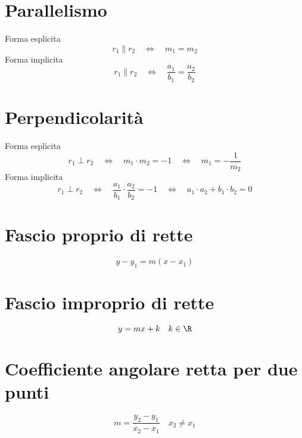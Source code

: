 \section{Parallelismo}
Forma esplicita
\begin{equation}
r_1\parallel r_2\quad\Longleftrightarrow\quad	m_1=m_2
\end{equation}
Forma implicita
\begin{equation}
r_1\parallel r_2\quad\Longleftrightarrow\quad \dfrac{a_1}{b_1}=\dfrac{a_2}{b_2}
\end{equation}
\section{Perpendicolarità}
Forma esplicita
\begin{equation}
r_1\perp r_2\quad\Longleftrightarrow\quad	m_1 \cdot m_2=-1\quad\Longleftrightarrow\quad	m_1=-\dfrac{1}{m_2}
\end{equation}
Forma implicita
\begin{equation}
r_1\perp r_2\quad\Longleftrightarrow\quad	\dfrac{a_1}{b_1}\cdot\dfrac{a_2}{b_2}=-1\quad\Longleftrightarrow\quad a_1\cdot a_2+b_1\cdot b_2=0
\end{equation}
\section{Fascio proprio di rette}
\begin{equation}
y-y_1=m(x-x_1)
\end{equation}
\section{Fascio improprio di rette}
\begin{equation}
y=mx+k\quad k\in\R
\end{equation}
\section{Coefficiente angolare retta per due punti}
\begin{equation}
m=\dfrac{y_2-y_1}{x_2-x_1}\quad x_2\neq x_1
\end{equation}
